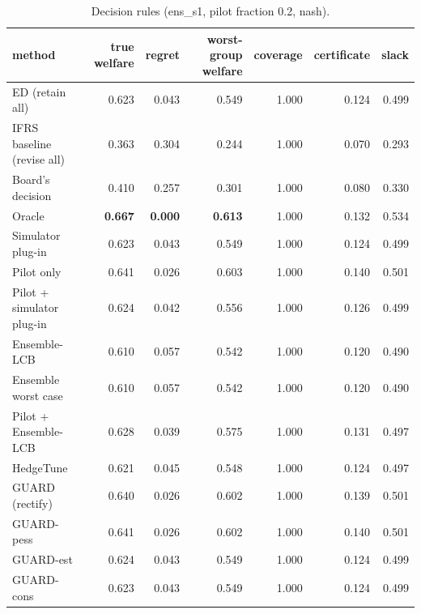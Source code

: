 \begin{table}[t]
\centering
\small
\begin{tabular}{lrrrrrr}
\toprule
method & true welfare & regret & worst-group welfare & coverage & certificate & slack \\
\midrule
ED (retain all) & 0.623 & 0.043 & 0.549 & 1.000 & 0.124 & 0.499 \\
IFRS baseline (revise all) & 0.363 & 0.304 & 0.244 & 1.000 & 0.070 & 0.293 \\
Board's decision & 0.410 & 0.257 & 0.301 & 1.000 & 0.080 & 0.330 \\
Oracle & \textbf{0.667} & \textbf{0.000} & \textbf{0.613} & 1.000 & 0.132 & 0.534 \\
Simulator plug-in & 0.623 & 0.043 & 0.549 & 1.000 & 0.124 & 0.499 \\
Pilot only & 0.641 & 0.026 & 0.603 & 1.000 & 0.140 & 0.501 \\
Pilot + simulator plug-in & 0.624 & 0.042 & 0.556 & 1.000 & 0.126 & 0.499 \\
Ensemble-LCB & 0.610 & 0.057 & 0.542 & 1.000 & 0.120 & 0.490 \\
Ensemble worst case & 0.610 & 0.057 & 0.542 & 1.000 & 0.120 & 0.490 \\
Pilot + Ensemble-LCB & 0.628 & 0.039 & 0.575 & 1.000 & 0.131 & 0.497 \\
HedgeTune & 0.621 & 0.045 & 0.548 & 1.000 & 0.124 & 0.497 \\
GUARD (rectify) & 0.640 & 0.026 & 0.602 & 1.000 & 0.139 & 0.501 \\
GUARD-pess & 0.641 & 0.026 & 0.602 & 1.000 & 0.140 & 0.501 \\
GUARD-est & 0.624 & 0.043 & 0.549 & 1.000 & 0.124 & 0.499 \\
GUARD-cons & 0.623 & 0.043 & 0.549 & 1.000 & 0.124 & 0.499 \\
\bottomrule
\end{tabular}
\caption{Decision rules (ens\_s1, pilot fraction 0.2, nash).}
\label{tab:methods-nash}
\end{table}
